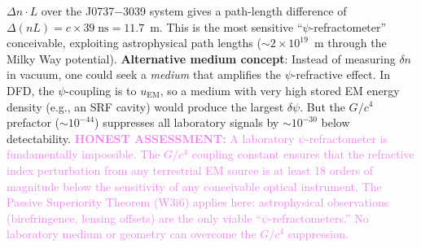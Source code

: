 \documentclass[11pt]{article}
\theoremstyle{definition}
\theoremstyle{remark}
\newcommand{\honest}[1]{\textcolor{violet}{\textbf{HONEST ASSESSMENT:} #1}}
\begin{document}
\begin{tcolorbox}[colback=blue!5!white, colframe=blue!60!black,
  title=\textbf{TOP 5 FINDINGS --- W4i16 P6 (Ranked by Impact)}]
\begin{enumerate}[nosep]
  $\Delta n \cdot L$ over the J0737$-$3039 system gives a
  path-length difference of $\Delta(nL) = c \times 39\;\mathrm{ns}
  = 11.7$~m.  This is the most sensitive ``$\psi$-refractometer''
  conceivable, exploiting astrophysical path lengths
  ($\sim 2 \times 10^{19}$~m through the Milky Way potential).
  \textbf{Alternative medium concept}: Instead of measuring
  $\delta n$ in vacuum, one could seek a \emph{medium} that
  amplifies the $\psi$-refractive effect.  In DFD, the
  $\psi$-coupling is to $u_{\mathrm{EM}}$, so a medium with
  very high stored EM energy density (e.g., an SRF cavity)
  would produce the largest $\delta\psi$.  But the $G/c^4$
  prefactor ($\sim 10^{-44}$) suppresses all laboratory signals
  by $\sim 10^{-30}$ below detectability.
  \honest{A laboratory $\psi$-refractometer is fundamentally
  impossible.  The $G/c^4$ coupling constant ensures that
  the refractive index perturbation from any terrestrial
  EM source is at least 18 orders of magnitude below the
  sensitivity of any conceivable optical instrument.
  The Passive Superiority Theorem (W3i6) applies here:
  astrophysical observations (birefringence, lensing offsets)
  are the only viable ``$\psi$-refractometers.''  No laboratory
  medium or geometry can overcome the $G/c^4$ suppression.}


\end{enumerate}
\end{tcolorbox}
\end{document}
